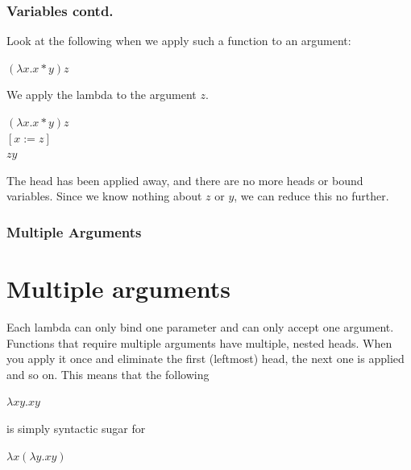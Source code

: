 \documentclass{beamer}
\begin{document}
    \begin{frame} [fragile, label = test]
        \frametitle{Variables contd. }
        Look at the following when we apply such a function to an argument:  
        \pause
        \begin{center}
        $(\lambda x.x*y)z$
        \end{center}
        \pause
        We apply the lambda to the argument $z$. \\
        \begin{center}
        $(\lambda x.x*y)z$ \\
        
        \hspace{.25in}$[x:=z]$ \\
        
        \hspace{.55in}$zy$  \\
        
        \end{center}
        \pause
        The head has been applied away, and there are no more heads or bound variables. Since we know nothing about $z$ or $y$, we can reduce this no further.
        \end{frame}
        \begin{frame} [fragile, label = test]
            \frametitle{Multiple Arguments }
            \section{Multiple arguments}
            Each lambda can only bind one parameter and can only accept one argument. Functions that require multiple arguments have multiple, nested heads. When you apply it once and eliminate the first (leftmost) head, the next one is applied and so on. This means that the following
            \begin{center}
            $\lambda xy.xy$
            \pause
            \end{center}
            is simply syntactic sugar for 
            \begin{center}
            $\lambda x(\lambda y.xy)$
            \end{center}
            
            \end{frame}
            
\end{document}
